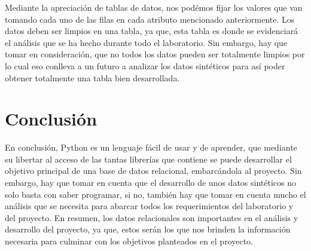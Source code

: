 \documentclass[10pt, oneside,spanish]{article}   	%
\begin{document}
Mediante la apreciación de tablas de datos, nos podémos fijar los valores que van tomando cada uno de las filas en cada atributo mencionado anteriormente. Los datos deben ser limpios en una tabla, ya que, esta tabla es donde se evidenciará el análisis que se ha hecho durante todo el laboratorio. Sin embargo, hay que tomar en consideración, que no todos los datos pueden ser totalmente limpios por lo cual eso conlleva a un futuro a analizar los datos sintéticos para así poder obtener totalmente una tabla bien desarrollada.

\section{Conclusión}
En conclusión, Python es un lenguaje fácil de usar y de aprender, que mediante su libertar al acceso de las tantas librerías que contiene se puede desarrollar el objetivo principal de una base de datos relacional, embarcándola al proyecto. Sin embargo, hay que tomar en cuenta que el desarrollo de unos datos sintéticos no solo basta con saber programar, si no, también hay que tomar en cuenta mucho el análisis que se necesita para abarcar todos los requerimientos del laboratorio y del proyecto. En resumen, los datos relacionales son importantes en el análisis y desarrollo del proyecto, ya que, estos serán los que nos brinden la información necesaria para culminar con los objetivos planteados en el proyecto. 

\nocite{*}


\end{document}

